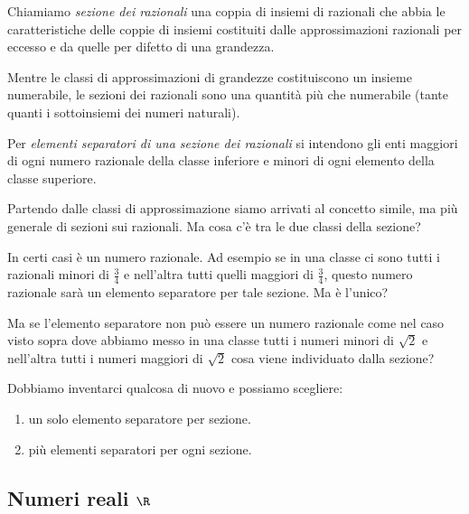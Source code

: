 Chiamiamo \emph{sezione dei razionali} una coppia di insiemi 
di razionali che abbia le caratteristiche delle coppie di insiemi costituiti 
dalle approssimazioni razionali per eccesso e da quelle per difetto di una 
grandezza.

Mentre le classi di approssimazioni di grandezze costituiscono un insieme 
numerabile, le sezioni dei razionali sono una quantità più che numerabile 
(tante quanti i sottoinsiemi dei numeri naturali). 

Per \emph{elementi separatori di una sezione dei razionali} 
si intendono gli enti maggiori di ogni numero razionale della classe 
inferiore e minori di ogni elemento della classe superiore.

Partendo dalle classi di approssimazione siamo arrivati al concetto simile, 
ma più generale di sezioni sui razionali. Ma cosa c'è tra le due classi della 
sezione? 

In certi casi è un numero razionale. Ad esempio se in una classe ci sono 
tutti i razionali minori di \(\frac{3}{4}\) e nell'altra tutti quelli 
maggiori di \(\frac{3}{4}\), questo numero razionale sarà un elemento 
separatore per tale sezione. Ma è l'unico?

Ma se l'elemento separatore non può essere un numero razionale come nel caso 
visto sopra dove abbiamo messo in una classe tutti i numeri minori di 
\(\sqrt{2}\) e nell'altra tutti i numeri maggiori di \(\sqrt{2}\) cosa viene 
individuato dalla sezione?

Dobbiamo inventarci qualcosa di nuovo e possiamo scegliere:
\begin{enumerate}
\item un solo elemento separatore per sezione.
\item più elementi separatori per ogni sezione.
\end{enumerate}

\subsection{Numeri reali \(\R\)}


